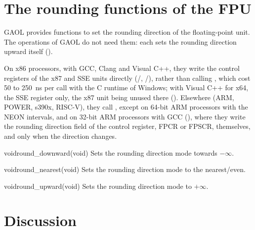 \documentclass[12pt,a4paper,twoside,openright]{book}
\begin{document}
\section{The rounding functions of the FPU}\label{chap:fpu}
%

GAOL provides functions to set the rounding direction of the floating-point
unit. The operations of GAOL do not need them: each sets the rounding
direction upward itself ().

\medskip
On x86 processors, with GCC, Clang and Visual C++, they write the control
registers of the x87 and SSE units directly (/,
/), rather than calling ,
which cost 50 to 250~ns per call with the C runtime of Windows; with Visual
C++ for x64, the SSE register only, the x87 unit being unused there
().\newinvfive{} Elsewhere (ARM, POWER,
s390x, RISC-V), they call , except on 64-bit ARM
processors with the NEON intervals, and on 32-bit ARM processors with GCC
(), where they write the rounding direction field of the
control register, FPCR or FPSCR, themselves, and only when the direction
changes.\newinvfive

\begin{deffun}{void}{round\_downward}{(void)}
Sets the rounding direction mode towards $-\infty$.
\end{deffun}

\begin{deffun}{void}{round\_nearest}{(void)}
  Sets the rounding direction mode to the nearest/even.
\end{deffun}

\begin{deffun}{void}{round\_upward}{(void)}
  Sets the rounding direction mode to $+\infty$.
\end{deffun}

\section{Discussion}
\end{document}
